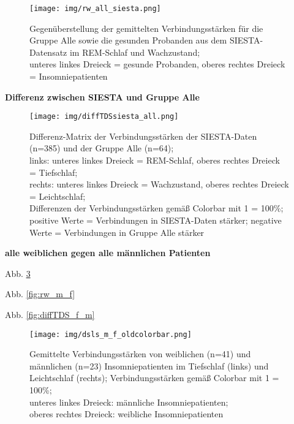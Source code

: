 \begin{figure}[H]
	\centering
	\texttt{[image: img/rw\_all\_siesta.png]}
	\caption[Verbindungsstärken für die Gruppe Alle und den SIESTA-Datensatz im \acs{REM}-Schlaf und Wachzustand]{Gegenüberstellung der gemittelten Verbindungsstärken für die Gruppe Alle sowie die gesunden Probanden aus dem SIESTA-Datensatz im \acs{REM}-Schlaf und Wachzustand;\\unteres linkes Dreieck = gesunde Probanden, oberes rechtes Dreieck = Insomniepatienten}
	\label{fig:rw_all_siesta}
\end{figure}




\textbf{Differenz zwischen SIESTA und Gruppe Alle}

\begin{figure}[H]
	\centering
	\texttt{[image: img/diffTDSsiesta\_all.png]}
	\caption[Differenz-Matrix der Verbindungsstärken der SIESTA-Daten und der Gruppe Alle]{Differenz-Matrix der Verbindungsstärken der SIESTA-Daten (n=385) und der Gruppe Alle (n=64);\\links: unteres linkes Dreieck = \acs{REM}-Schlaf, oberes rechtes Dreieck = Tiefschlaf;\\rechts: unteres linkes Dreieck = Wachzustand, oberes rechtes Dreieck = Leichtschlaf;\\Differenzen der Verbindungsstärken gemäß Colorbar mit 1 = 100\%;\\positive Werte = Verbindungen in SIESTA-Daten stärker; negative Werte = Verbindungen in Gruppe Alle stärker}
	\label{fig:diffTDSsiesta_all}
\end{figure}



\textbf{alle weiblichen gegen alle männlichen Patienten}

Abb. \ref{fig:dsls_m_f}

Abb. \ref{fig:rw_m_f}

Abb. \ref{fig:diffTDS_f_m}

\begin{figure}[H]
	\centering
	\texttt{[image: img/dsls\_m\_f\_oldcolorbar.png]}
	\caption[Verbindungsstärken von weiblichen und männlichen Insomniepatienten]{Gemittelte Verbindungsstärken von weiblichen (n=41) und männlichen (n=23) Insomniepatienten im Tiefschlaf (links) und Leichtschlaf (rechts); Verbindungsstärken gemäß Colorbar mit 1 = 100\%;\\unteres linkes Dreieck: männliche Insomniepatienten;\\oberes rechtes Dreieck: weibliche Insomniepatienten}
	\label{fig:dsls_m_f}
\end{figure}

